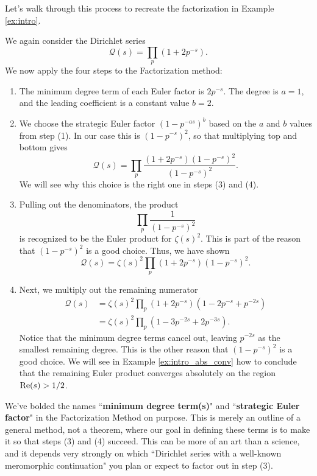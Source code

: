 \documentclass[12pt]{amsart}
\newenvironment{BOXexample}{
\begin{exbox}\mbox{}
\begin{example}
}
{
\end{example}
\end{exbox}
}
\theoremstyle{plain}
\begin{document}
Let's walk through this process to recreate the factorization in Example \ref{ex:intro}.

\begin{BOXexample}\label{ex:intro_expanded}
    We again consider the Dirichlet series
    \[
    \mathcal{Q}(s) = \prod_p (1 + 2p^{-s}).
    \]
    We now apply the four steps to the Factorization method:
    \begin{enumerate}[(1)]
    \item The minimum degree term of each Euler factor is $2p^{-s}$. The degree is $a=1$, and the leading coefficient is a constant value $b=2$.

    \item We choose the strategic Euler factor $(1-p^{-as})^b$ based on the $a$ and $b$ values from step (1). In our case this is $(1 - p^{-s})^2$, so that multiplying top and bottom gives
    \[
    \mathcal{Q}(s) = \prod_p \frac{(1 + 2p^{-s})(1-p^{-s})^2}{(1-p^{-s})^2}.
    \]
    We will see why this choice is the right one in steps (3) and (4).

    \item Pulling out the denominators, the product
    \[
    \prod_p \frac{1}{(1-p^{-s})^2}
    \]
    is recognized to be the Euler product for $\zeta(s)^2$. This is part of the reason that $(1-p^{-s})^2$ is a good choice. Thus, we have shown
    \[
    \mathcal{Q}(s) = \zeta(s)^2\prod_p (1 + 2p^{-s})(1-p^{-s})^2.
    \]

    \item Next, we multiply out the remaining numerator
    \begin{align*}
        \mathcal{Q}(s) &= \zeta(s)^2\prod_p (1 + 2p^{-s})(1-2p^{-s}+p^{-2s})\\
        &= \zeta(s)^2\prod_p (1 -3p^{-2s} + 2p^{-3s}).
    \end{align*}
    Notice that the minimum degree terms cancel out, leaving $p^{-2s}$ as the smallest remaining degree. This is the other reason that $(1-p^{-s})^2$ is a good choice. We will see in Example \ref{ex:intro_abs_conv} how to conclude that the remaining Euler product converges absolutely on the region ${\rm Re}(s)>1/2$.
    \end{enumerate}
\end{BOXexample}

We've bolded the names ``\textbf{minimum degree term(s)}" and ``\textbf{strategic Euler factor}" in the Factorization Method on purpose. This is merely an outline of a general method, not a theorem, where our goal in defining these terms is to make it so that steps (3) and (4) succeed. This can be more of an art than a science, and it depends very strongly on which ``Dirichlet series with a well-known meromorphic continuation" you plan or expect to factor out in step (3).
\end{document}
